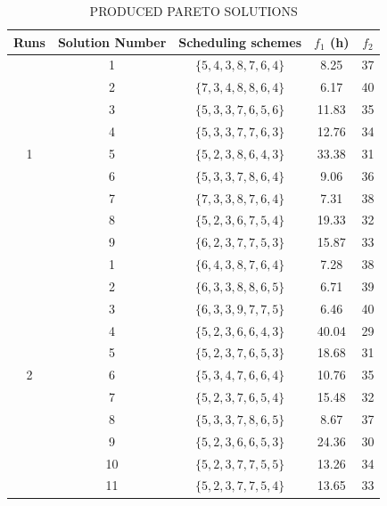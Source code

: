 \begin{table}
    \centering
    \caption{PRODUCED PARETO SOLUTIONS}
    \renewcommand{\arraystretch}{1.5}
    \begin{tabular}{ |c c c c c|  }
        \hline
        Runs & Solution Number & Scheduling schemes & $f_1$ (h) & $f_2$\\
        \hline
        \multirow{9}{*}{1} & 1 & $\{5, 4, 3, 8, 7, 6, 4\}$ & 8.25  & 37 \\
                           & 2 & $\{7, 3, 4, 8, 8, 6, 4\}$ & 6.17  & 40 \\
                           & 3 & $\{5, 3, 3, 7, 6, 5, 6\}$ & 11.83 & 35 \\
                           & 4 & $\{5, 3, 3, 7, 7, 6, 3\}$ & 12.76 & 34 \\
                           & 5 & $\{5, 2, 3, 8, 6, 4, 3\}$ & 33.38 & 31 \\
                           & 6 & $\{5, 3, 3, 7, 8, 6, 4\}$ & 9.06  & 36 \\
                           & 7 & $\{7, 3, 3, 8, 7, 6, 4\}$ & 7.31  & 38 \\
                           & 8 & $\{5, 2, 3, 6, 7, 5, 4\}$ & 19.33 & 32 \\
                           & 9 & $\{6, 2, 3, 7, 7, 5, 3\}$ & 15.87 & 33 \\
        \hline
        \multirow{12}{*}{2} & 1  & $\{6, 4, 3, 8, 7, 6, 4\}$ & 7.28  & 38 \\
                           & 2  & $\{6, 3, 3, 8, 8, 6, 5\}$ & 6.71  & 39 \\
                           & 3  & $\{6, 3, 3, 9, 7, 7, 5\}$ & 6.46  & 40 \\
                           & 4  & $\{5, 2, 3, 6, 6, 4, 3\}$ & 40.04 & 29 \\
                           & 5  & $\{5, 2, 3, 7, 6, 5, 3\}$ & 18.68 & 31 \\
                           & 6  & $\{5, 3, 4, 7, 6, 6, 4\}$ & 10.76 & 35 \\
                           & 7  & $\{5, 2, 3, 7, 6, 5, 4\}$ & 15.48 & 32 \\
                           & 8  & $\{5, 3, 3, 7, 8, 6, 5\}$ & 8.67  & 37 \\
                           & 9  & $\{5, 2, 3, 6, 6, 5, 3\}$ & 24.36 & 30 \\
                           & 10 & $\{5, 2, 3, 7, 7, 5, 5\}$ & 13.26 & 34 \\
                           & 11 & $\{5, 2, 3, 7, 7, 5, 4\}$ & 13.65 & 33 \\

\end{tabular}
\end{table}
